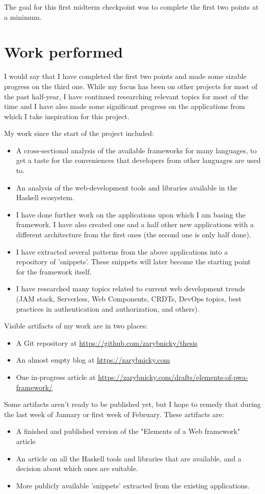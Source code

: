 \documentclass[11pt,a4paper]{scrartcl}
\begin{document}
The goal for this first midterm checkpoint was to complete the first two points
at a minimum.

\section{Work performed}
\label{sec:org81c739e}
I would say that I have completed the first two points and made some sizable
progress on the third one. While my focus has been on other projects for most of
the past half-year, I have continued researching relevant topics for most of the
time and I have also made some significant progress on the applications from
which I take inspiration for this project.

My work since the start of the project included:
\begin{itemize}
\item A cross-sectional analysis of the available frameworks for many languages, to
get a taste for the conveniences that developers from other languages are used
to.
\item An analysis of the web-development tools and libraries available in the
Haskell ecosystem.
\item I have done further work on the applications upon which I am basing the
framework. I have also created one and a half other new applications with a
different architecture from the first ones (the second one is only half done).
\item I have extracted several patterns from the above applications into a
repository of 'snippets'. These snippets will later become the starting point
for the framework itself.
\item I have researched many topics related to current web development trends
(JAM stack, Serverless, Web Components, CRDTs, DevOps topics, best practices
in authentication and authorization, and others).
\end{itemize}

Visible artifacts of my work are in two places:
\begin{itemize}
\item A Git repository at \url{https://github.com/zarybnicky/thesis}
\item An almost empty blog at \url{https://zarybnicky.com}
\item One in-progress article at
\url{https://zarybnicky.com/drafts/elements-of-pwa-framework/}
\end{itemize}

Some artifacts aren't ready to be published yet, but I hope to remedy that
during the last week of January or first week of February. These artifacts are:
\begin{itemize}
\item A finished and published version of the "Elements of a Web framework" article
\item An article on all the Haskell tools and libraries that are available, and a
decision about which ones are suitable.
\item More publicly available 'snippets' extracted from the existing applications.
\end{itemize}
\end{document}
